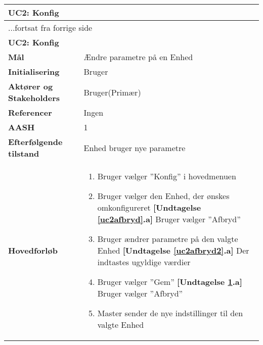 \begin{center} \centering \label{UC2}
	\begin{longtable}{|p{5cm}|p{9cm}|}  %
	\hline
		\multicolumn{2}{|l|}{\textbf{UC2: Konfig}} \\\hline %
		\endfirsthead
		
		\multicolumn{2}{l}{...fortsat fra forrige side} \\ \hline %
		\multicolumn{2}{|l|}{\textbf{UC2: Konfig}} \\\hline %
		\endhead	
		
		\textbf{Mål}								&Ændre parametre på en Enhed		\\\hline
		\textbf{Initialisering}					&Bruger							\\\hline
		\textbf{Aktører og Stakeholders}			&Bruger(Primær)					\\\hline
		\textbf{Referencer}						&Ingen							\\\hline
		\textbf{AASH}							&1								\\\hline
		\textbf{Efterfølgende tilstand}			&Enhed bruger nye parametre		\\\hline
		\textbf{Hovedforløb}					
			&\begin{enumerate}
	
				\item Bruger vælger ''Konfig'' i hovedmenuen
				
				\item \label{uc2afbryd}Bruger vælger den Enhed, der ønskes omkonfigureret\newline
				\textbf{[Undtagelse \ref{uc2afbryd}.a]} \newline
					Bruger vælger ''Afbryd''
				
				\item \label{uc2afbryd2}Bruger ændrer parametre på den valgte Enhed
				\textbf{[Undtagelse \ref{uc2afbryd2}.a]} \newline
					Der indtastes ugyldige værdier	
									
				\item \label{uc2afbryd3} Bruger vælger ''Gem''\newline
				\textbf{[Undtagelse \ref{uc2afbryd3}.a]} \newline
					Bruger vælger ''Afbryd''
				
				\item Master sender de nye indstillinger til den valgte Enhed
			

\end{enumerate}
\end{longtable}
\end{center}
